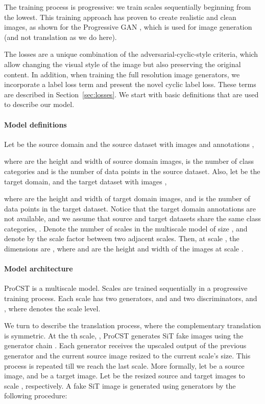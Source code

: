 \documentclass[letterpaper]{article} \usepackage[]{aaai23}  \usepackage{times}  \usepackage{helvet}  \usepackage{courier}  \usepackage[hyphens]{url}  \usepackage{graphicx} \urlstyle{rm} \def\UrlFont{\rm}  \usepackage{natbib}  \usepackage{caption} \frenchspacing  \setlength{\pdfpagewidth}{8.5in} \setlength{\pdfpageheight}{11in} \usepackage{algorithm}
\begin{document}
The training process is progressive: we train scales sequentially beginning from the lowest. This training approach has proven to create realistic and clean images, as shown for the Progressive GAN \cite{karras2017progressive}, which is used for image generation (and not translation as we do here). 

The losses are a unique combination of the adversarial-cyclic-style criteria, which allow changing the visual style of the image but also preserving the original content. In addition, when training the full resolution image generators, we incorporate a label loss term and present the novel cyclic label loss. These terms are described in Section~\ref{sec:losses}. We start with basic definitions that are used to describe our model. 


\paragraph{Model definitions}
Let  be the source domain and  the source dataset with images  and annotations , 

where  are the height and width of source domain images,  is the number of class categories and  is the number of data points in the source dataset. Also, let  be the target domain, and  the target dataset with images ,

where  are the height and width of target domain images, and  is the number of data points in the target dataset.
Notice that the target domain annotations are not available, and we assume that source and target datasets share the same class categories, .
Denote  the number of scales in the multiscale model of size ,
and denote by  the scale factor between two adjacent scales.
Then, at scale , the dimensions are , where  and  are the height and width of the images at scale .


 \paragraph{Model architecture}
ProCST is a multiscale model. Scales are trained sequentially in a progressive training process. Each scale has two generators,  and  and two discriminators,  and , where  denotes the scale level. 

We turn to describe the  translation process, where the complementary translation  is symmetric. 
At the th scale, , ProCST generates SiT fake images using the generator chain . Each generator receives the upscaled output of the previous generator and the current source image resized to the current scale's size. This process is repeated till we reach the last scale. More formally, let  be a source image, and   be a target image. Let  be the resized source and target images to scale , respectively. A fake SiT image  is generated using  generators  by the following procedure: 
\end{document}
